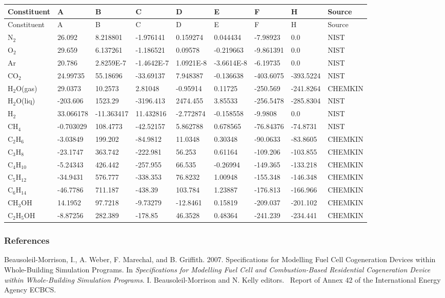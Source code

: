 {\scriptsize
\begin{longtable}[c]{p{0.6in}p{0.6in}p{0.6in}p{0.6in}p{0.6in}p{0.6in}p{0.6in}p{0.6in}p{0.6in}}
\toprule 
Constituent & A & B & C & D & E & F & H & Source \tabularnewline
\midrule
\endfirsthead

\toprule 
Constituent & A & B & C & D & E & F & H & Source \tabularnewline
\midrule
\endhead

N\(_{2}\) & 26.092 & 8.218801 & -1.976141 & 0.159274 & 0.044434 & -7.98923 & 0.0 & NIST \tabularnewline
O\(_{2}\) & 29.659 & 6.137261 & -1.186521 & 0.09578 & -0.219663 & -9.861391 & 0.0 & NIST \tabularnewline
Ar & 20.786 & 2.8259E-7 & -1.4642E-7 & 1.0921E-8 & -3.6614E-8 & -6.19735 & 0.0 & NIST \tabularnewline
CO\(_{2}\) & 24.99735 & 55.18696 & -33.69137 & 7.948387 & -0.136638 & -403.6075 & -393.5224 & NIST \tabularnewline
H\(_{2}\)O(gas) & 29.0373 & 10.2573 & 2.81048 & -0.95914 & 0.11725 & -250.569 & -241.8264 & CHEMKIN \tabularnewline
H\(_{2}\)O(liq) & -203.606 & 1523.29 & -3196.413 & 2474.455 & 3.85533 & -256.5478 & -285.8304 & NIST \tabularnewline
H\(_{2}\) & 33.066178 & -11.363417 & 11.432816 & -2.772874 & -0.158558 & -9.9808 & 0.0 & NIST \tabularnewline
CH\(_{4}\) & -0.703029 & 108.4773 & -42.52157 & 5.862788 & 0.678565 & -76.84376 & -74.8731 & NIST \tabularnewline
C\(_{2}\)H\(_{6}\) & -3.03849 & 199.202 & -84.9812 & 11.0348 & 0.30348 & -90.0633 & -83.8605 & CHEMKIN \tabularnewline
C\(_{3}\)H\(_{8}\) & -23.1747 & 363.742 & -222.981 & 56.253 & 0.61164 & -109.206 & -103.855 & CHEMKIN \tabularnewline
C\(_{4}\)H\(_{10}\) & -5.24343 & 426.442 & -257.955 & 66.535 & -0.26994 & -149.365 & -133.218 & CHEMKIN \tabularnewline
C\(_{5}\)H\(_{12}\) & -34.9431 & 576.777 & -338.353 & 76.8232 & 1.00948 & -155.348 & -146.348 & CHEMKIN \tabularnewline
C\(_{6}\)H\(_{14}\) & -46.7786 & 711.187 & -438.39 & 103.784 & 1.23887 & -176.813 & -166.966 & CHEMKIN \tabularnewline
CH\(_{3}\)OH & 14.1952 & 97.7218 & -9.73279 & -12.8461 & 0.15819 & -209.037 & -201.102 & CHEMKIN \tabularnewline
C\(_{2}\)H\(_{5}\)OH & -8.87256 & 282.389 & -178.85 & 46.3528 & 0.48364 & -241.239 & -234.441 & CHEMKIN \tabularnewline
\bottomrule
\end{longtable}}

\subsubsection{References}\label{references-2-005}

Beausoleil-Morrison, I., A. Weber, F. Marechal, and B. Griffith. 2007. Specifications for Modelling Fuel Cell Cogeneration Devices within Whole-Building Simulation Programs. In \emph{Specifications for Modelling Fuel Cell and Combustion-Based Residential Cogeneration Device within Whole-Building Simulation Programs}. I. Beausoleil-Morrison and N. Kelly editors.~ Report of Annex 42 of the International Energy Agency ECBCS.

